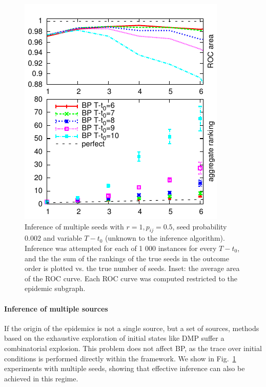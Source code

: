 \begin{figure}
\includegraphics[width=1\columnwidth, angle=0]{zero_patient/multiseeds}
\caption{Inference of multiple seeds with $r=1,p_{ij}=0.5$, seed probability $0.002$ and variable $T-t_0$ (unknown to the inference algorithm). Inference was attempted for each of 1 000 instances for every $T-t_0$, and the the sum of the rankings of the true seeds in the outcome order is plotted vs. the true number of seeds. Inset: the average area of the ROC curve. Each ROC curve was computed restricted to the epidemic subgraph.\label{fig:multiseeds} }
\end{figure}
\paragraph*{Inference of multiple sources}
If the origin of the epidemics is not a single source, but a set of sources, methods based on the exhaustive exploration of initial states like DMP suffer a combinatorial explosion. This problem does not affect BP, as the trace over initial conditions is performed directly within the framework. We show in Fig.~\ref{fig:multiseeds} experiments with multiple seeds, showing that effective inference can also be achieved in this regime.


